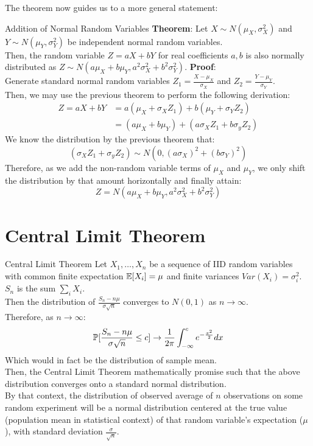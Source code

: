 The theorem now guides us to a more general statement:
\begin{ln-theorem}{Addition of Normal Random Variables}{}
    \textbf{Theorem}: Let $X \sim N(\mu_X, \sigma_X^2)$ and $Y \sim N(\mu_Y, \sigma_Y^2)$ be independent normal random variables. \\
    Then, the random variable $Z = aX + bY$ for real coefficients $a, b$ is also normally distributed as $Z \sim N(a\mu_X + b\mu_Y, a^2 \sigma_X^2 + b^2 \sigma_Y^2)$.
    \tcblower
    \textbf{Proof}: \\
    Generate standard normal random variables $Z_1 = \frac{X - \mu_X}{\sigma_X}$ and $Z_2 = \frac{Y - \mu_Y}{\sigma_Y}$. \\
    Then, we may use the previous theorem to perform the following derivation:
    \begin{align*}
        Z = aX + bY &= a(\mu_X + \sigma_X Z_1) + b(\mu_Y + \sigma_Y Z_2) \\
        &= (a\mu_X + b\mu_Y) + (a\sigma_X Z_1 + b\sigma_y Z_2)
    \end{align*}
    We know the distribution by the previous theorem that:
    \[(\sigma_X Z_1 + \sigma_y Z_2) \sim N(0, {(a \sigma_X)}^2 + {(b\sigma_Y)}^2)\]
    Therefore, as we add the non-random variable terms of $\mu_X$ and $\mu_Y$, we only shift the distribution by that amount horizontally and finally attain:
    \[Z = N(a\mu_X + b\mu_Y, a^2 \sigma_X^2 + b^2 \sigma_Y^2)\]
\end{ln-theorem}

\section{Central Limit Theorem}
\begin{ln-theorem}{Central Limit Theorem}{}
    Let $X_1, \dots, X_n$ be a sequence of IID random variables with common finite expectation $\E[X_i] = \mu$ and finite variances $Var(X_i) = \sigma_i^2$. $S_n$ is the sum $\sum_i X_i$.\\
    Then the distribution of $\frac{S_n - n\mu}{\sigma \sqrt{n}}$ converges to $N(0, 1)$ as $n \rightarrow \infty$. \\
    Therefore, as $n \rightarrow \infty$:
    \[
        \P[\frac{S_n - n\mu}{\sigma \sqrt{n}} \leq c] \rightarrow \frac{1}{2\pi} \int_{-\infty}^c e^{-\frac{x^2}{2}} dx
    \]
    Which would in fact be the distribution of sample mean. \\
    Then, the Central Limit Theorem mathematically promise such that the above distribution converges onto a standard normal distribution. \\
    By that context, the distribution of observed average of $n$ observations on some random experiment will be a normal distribution centered at the true value (population mean in statistical context) of that random variable's expectation ($\mu$), with standard deviation $\frac{\sigma}{\sqrt{n}}$.
\end{ln-theorem}
